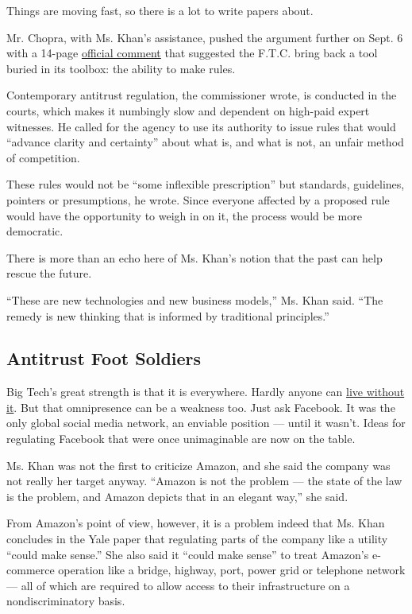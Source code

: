 Things are moving fast, so there is a lot to write papers about.

Mr. Chopra, with Ms. Khan's assistance, pushed the argument further on
Sept. 6 with a 14-page
\href{https://www.ftc.gov/system/files/documents/public_statements/1408196/chopra_-_comment_to_hearing_1_9-6-18.pdf}{official
comment} that suggested the F.T.C. bring back a tool buried in its
toolbox: the ability to make rules.

Contemporary antitrust regulation, the commissioner wrote, is conducted
in the courts, which makes it numbingly slow and dependent on high-paid
expert witnesses. He called for the agency to use its authority to issue
rules that would ``advance clarity and certainty'' about what is, and
what is not, an unfair method of competition.

These rules would not be ``some inflexible prescription'' but standards,
guidelines, pointers or presumptions, he wrote. Since everyone affected
by a proposed rule would have the opportunity to weigh in on it, the
process would be more democratic.

There is more than an echo here of Ms. Khan's notion that the past can
help rescue the future.

``These are new technologies and new business models,'' Ms. Khan said.
``The remedy is new thinking that is informed by traditional
principles.''

\hypertarget{antitrust-foot-soldiers}{%
\subsection{Antitrust Foot Soldiers}\label{antitrust-foot-soldiers}}

Big Tech's great strength is that it is everywhere. Hardly anyone can
\href{https://www.nytimes3xbfgragh.onion/interactive/2017/05/10/technology/Ranking-Apple-Amazon-Facebook-Microsoft-Google.html}{live
without it}. But that omnipresence can be a weakness too. Just ask
Facebook. It was the only global social media network, an enviable
position --- until it wasn't. Ideas for regulating Facebook that were
once unimaginable are now on the table.

Ms. Khan was not the first to criticize Amazon, and she said the company
was not really her target anyway. ``Amazon is not the problem --- the
state of the law is the problem, and Amazon depicts that in an elegant
way,'' she said.

From Amazon's point of view, however, it is a problem indeed that Ms.
Khan concludes in the Yale paper that regulating parts of the company
like a utility ``could make sense.'' She also said it ``could make
sense'' to treat Amazon's e-commerce operation like a bridge, highway,
port, power grid or telephone network --- all of which are required to
allow access to their infrastructure on a nondiscriminatory basis.


